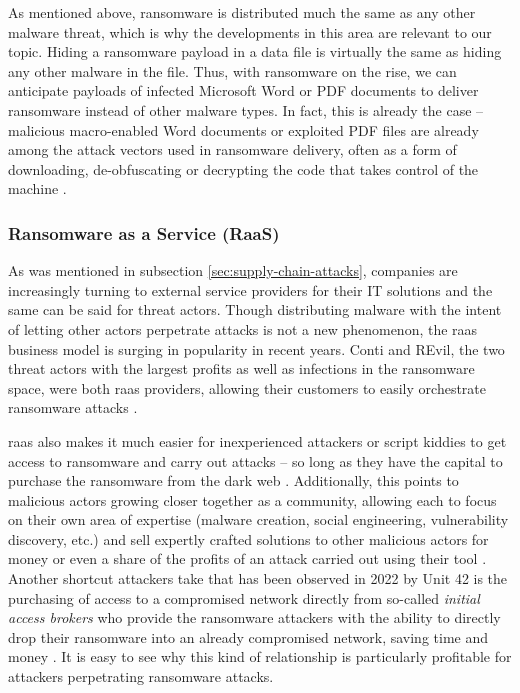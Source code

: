 As mentioned above, ransomware is distributed much the same as any other malware threat, which is why the developments
in this area are relevant to our topic. Hiding a ransomware payload in a data file is virtually the same as hiding
any other malware in the file. Thus, with ransomware on the rise, we can anticipate payloads of infected Microsoft
Word or PDF documents to deliver ransomware instead of other malware types. In fact, this is already the case -- 
malicious macro-enabled Word documents or exploited PDF files are already among the attack vectors used in ransomware
delivery, often as a form of downloading, de-obfuscating or decrypting the code that takes control of the machine
\cite[p.~8-10]{ransomware-book}.


\subsubsection{Ransomware as a Service (RaaS)}
As was mentioned in subsection \ref{sec:supply-chain-attacks}, companies are increasingly turning to external service providers 
for their IT solutions and the same can be said for threat actors. Though distributing malware with the intent of
letting other actors perpetrate attacks is not a new phenomenon, the \acrfull{raas} business model is surging in
popularity in recent years. Conti and REvil, the two threat actors with the largest profits as well as infections in the ransomware 
space, were both \acrshort{raas} providers, allowing their customers to easily orchestrate ransomware attacks
\cite{enisa_threat_landscape, unit42-ransomware}.

\acrshort{raas} also makes it much easier for inexperienced attackers or script kiddies to get access to ransomware
and carry out attacks -- so long as they have the capital to purchase the ransomware from the dark web
\cite{social-engineering-ransomware-vector}. Additionally, this points to malicious actors growing closer together
as a community, allowing each to focus on their own area of expertise (malware creation, social engineering,
vulnerability discovery, etc.) and sell expertly crafted solutions to other malicious actors for money or even 
a share of the profits of an attack carried out using their tool \cite{enisa_threat_landscape}.
Another shortcut attackers take that has been observed in 2022 by Unit 42 is the purchasing of access to a compromised 
network directly from so-called \emph{initial access brokers} who provide the ransomware attackers with the ability to
directly drop their ransomware into an already compromised network, saving time and money \cite{unit42-ransomware}.
It is easy to see why this kind of relationship is particularly profitable for attackers perpetrating ransomware
attacks. 

